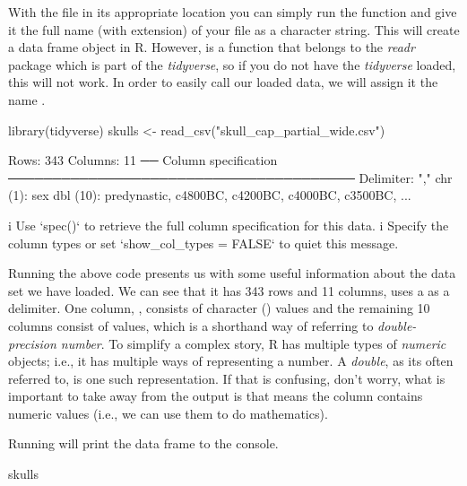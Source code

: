 With the file in its appropriate location you can simply run the function  and give it the full name (with extension) of your file as a character string. This will create a data frame object in R. However,  is a function that belongs to the \textit{readr} package which is part of the \textit{tidyverse}, so if you do not have the \textit{tidyverse} loaded, this will not work. In order to easily call our loaded data, we will assign it the name .

\begin{inR}
library(tidyverse)
skulls <- read_csv("skull_cap_partial_wide.csv")
\end{inR}

\begin{outR}
Rows: 343 Columns: 11                                          
── Column specification ───────────────────────────────────────
Delimiter: ","
chr  (1): sex
dbl (10): predynastic, c4800BC, c4200BC, c4000BC, c3500BC, ...

i Use `spec()` to retrieve the full column specification for this data.
i Specify the column types or set `show_col_types = FALSE` to quiet this message.
\end{outR}

Running the above code presents us with some useful information about the data set we have loaded.  We can see that it has 343 rows and 11 columns, uses a \R{,} as a delimiter. One column, , consists of character () values and the remaining 10 columns consist of  values, which is a shorthand way of referring to \textit{double-precision number}. To simplify a complex story, R has multiple types of \textit{numeric} objects; i.e., it has multiple ways of representing a number. A \textit{double}, as its often referred to, is one such representation. If that is confusing, don't worry, what is important to take away from the output is that  means the column contains numeric values (i.e., we can use them to do mathematics).

Running  will print the data frame to the console.

\begin{inR}
skulls
\end{inR}

